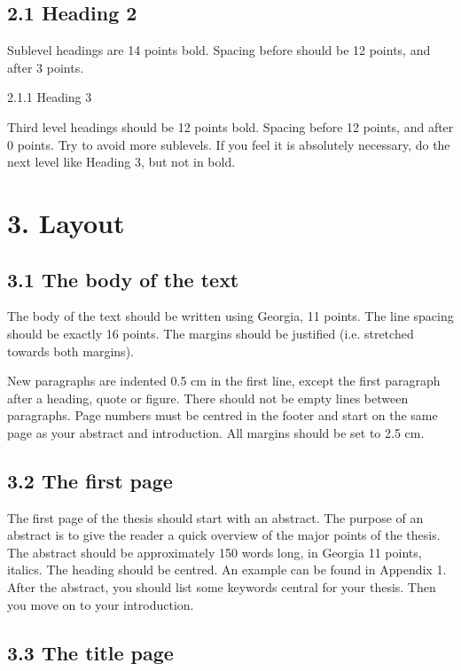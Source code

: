 \documentclass[]{article}
\begin{document}
\subsection{2.1 Heading 2}

Sublevel headings are 14 points bold. Spacing before should be 12
points, and after 3 points.

2.1.1 Heading 3

Third level headings should be 12 points bold. Spacing before 12 points,
and after 0 points. Try to avoid more sublevels. If you feel it is
absolutely necessary, do the next level like Heading 3, but not in bold.

\section{3. Layout}

\subsection{3.1 The body of the text}

The body of the text should be written using Georgia, 11 points. The
line spacing should be exactly 16 points. The margins should be
justified (i.e. stretched towards both margins).

New paragraphs are indented 0.5 cm in the first line, except the first
paragraph after a heading, quote or figure. There should not be empty
lines between paragraphs. Page numbers must be centred in the footer
and start on the same page as your abstract and introduction. All
margins should be set to 2.5 cm.

\subsection{3.2 The first page}

The first page of the thesis should start with an abstract. The purpose
of an abstract is to give the reader a quick overview of the major
points of the thesis. The abstract should be approximately 150 words
long, in Georgia 11 points, italics. The heading should be centred. An
example can be found in Appendix 1. After the abstract, you should list
some keywords central for your thesis. Then you move on to your
introduction.

\subsection{3.3 The title page}
\end{document}
